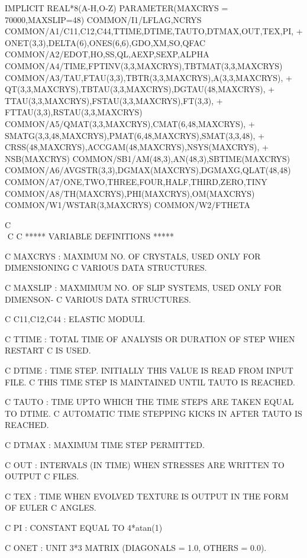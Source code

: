 	IMPLICIT REAL*8(A-H,O-Z)
	PARAMETER(MAXCRYS = 70000,MAXSLIP=48)
	COMMON/I1/LFLAG,NCRYS
        COMMON/A1/C11,C12,C44,TTIME,DTIME,TAUTO,DTMAX,OUT,TEX,PI,
     +     ONET(3,3),DELTA(6),ONES(6,6),GDO,XM,SO,QFAC
	COMMON/A2/EDOT,HO,SS,QL,AEXP,SEXP,ALPHA
	COMMON/A4/TIME,FPTINV(3,3,MAXCRYS),TBTMAT(3,3,MAXCRYS)
	COMMON/A3/TAU,FTAU(3,3),TBTR(3,3,MAXCRYS),A(3,3,MAXCRYS),
     +     QT(3,3,MAXCRYS),TBTAU(3,3,MAXCRYS),DGTAU(48,MAXCRYS),
     +     TTAU(3,3,MAXCRYS),FSTAU(3,3,MAXCRYS),FT(3,3),
     +     FTTAU(3,3),RSTAU(3,3,MAXCRYS)
	COMMON/A5/QMAT(3,3,MAXCRYS),CMAT(6,48,MAXCRYS),
     +     SMATG(3,3,48,MAXCRYS),PMAT(6,48,MAXCRYS),SMAT(3,3,48),
     +     CRSS(48,MAXCRYS),ACCGAM(48,MAXCRYS),NSYS(MAXCRYS),
     +     NSB(MAXCRYS)
        COMMON/SB1/AM(48,3),AN(48,3),SBTIME(MAXCRYS)
	COMMON/A6/AVGSTR(3,3),DGMAX(MAXCRYS),DGMAXG,QLAT(48,48)
        COMMON/A7/ONE,TWO,THREE,FOUR,HALF,THIRD,ZERO,TINY
        COMMON/A8/TH(MAXCRYS),PHI(MAXCRYS),OM(MAXCRYS)
        COMMON/W1/WSTAR(3,MAXCRYS)
        COMMON/W2/FTHETA

C $$$$$$$$$$$$$$$$$$$$$$$$$$$$$$$$$$$$$$$$$$$$$$$$$$$$$$$$$$$$$$$$$$$$$$
C
C               ***** VARIABLE DEFINITIONS *****

C   MAXCRYS     : MAXIMUM NO. OF CRYSTALS, USED ONLY FOR DIMENSIONING
C                 VARIOUS DATA STRUCTURES.

C   MAXSLIP     : MAXMIMUM NO. OF SLIP SYSTEMS, USED ONLY FOR DIMENSON-
C                 VARIOUS DATA STRUCTURES.

C   C11,C12,C44 : ELASTIC MODULI.

C   TTIME       : TOTAL TIME OF ANALYSIS OR DURATION OF STEP WHEN RESTART
C                 IS USED.

C   DTIME       : TIME STEP. INITIALLY THIS VALUE IS READ FROM INPUT FILE.
C                 THIS TIME STEP IS MAINTAINED UNTIL TAUTO IS REACHED.

C   TAUTO       : TIME UPTO WHICH THE TIME STEPS ARE TAKEN EQUAL TO DTIME.
C                 AUTOMATIC TIME STEPPING KICKS IN AFTER TAUTO IS REACHED.

C   DTMAX       : MAXIMUM TIME STEP PERMITTED.

C   OUT         : INTERVALS (IN TIME) WHEN STRESSES ARE WRITTEN TO OUTPUT
C                 FILES.
 
C   TEX         : TIME WHEN EVOLVED TEXTURE IS OUTPUT IN THE FORM OF EULER
C                 ANGLES.

C   PI          : CONSTANT EQUAL TO 4*atan(1)

C   ONET        : UNIT 3*3 MATRIX (DIAGONALS = 1.0, OTHERS = 0.0).

